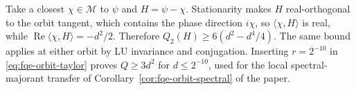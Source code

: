 Take a closest $\chi\in\mathcal M$ to $\psi$ and $H=\psi-\chi$.
Stationarity makes $H$ real-orthogonal to the orbit tangent, which contains the phase direction $i\chi$, so
$\langle\chi,H\rangle$ is real, while
$\operatorname{Re}\langle\chi,H\rangle=-d^2/2$. Therefore
$Q_2(H)\ge6(d^2-d^4/4)$. The same bound applies at either orbit by LU
invariance and conjugation. Inserting $r=2^{-10}$ in
\eqref{eq:fqe-orbit-taylor} proves $Q\ge3d^2$ for $d\le2^{-10}$, used for the local
spectral-majorant transfer of Corollary~\ref{cor:fqe-orbit-spectral} of the paper.




